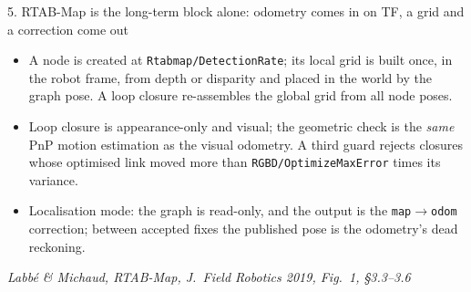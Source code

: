 \documentclass[11pt,aspectratio=169]{beamer}
\newcommand{\src}[1]{\vfill{\tiny\color{black!55}#1}}
\newcommand{\paper}[1]{\textit{#1}}
\begin{document}
\begin{frame}{5. RTAB-Map is the long-term block alone: odometry comes in on TF, a grid and a correction come out}
{}
  \par\vspace{0.3em}
  \scriptsize
  \begin{itemize}
    \item A node is created at \texttt{Rtabmap/DetectionRate}; its local grid
          is built once, in the robot frame, from depth or disparity and placed
          in the world by the graph pose. A loop closure re-assembles the
          global grid from all node poses.
    \item Loop closure is appearance-only and visual; the geometric check is the
          \emph{same} PnP motion estimation as the visual odometry. A third guard
          rejects closures whose optimised link moved more than
          \texttt{RGBD/OptimizeMaxError} times its variance.
    \item Localisation mode: the graph is read-only, and the output is the
          \texttt{map}$\to$\texttt{odom} correction; between accepted fixes the
          published pose is the odometry's dead reckoning.
  \end{itemize}
  \src{\paper{Labbé \& Michaud, RTAB-Map, J.\ Field Robotics 2019, Fig.~1, §3.3--3.6}}
\end{frame}
\end{document}
